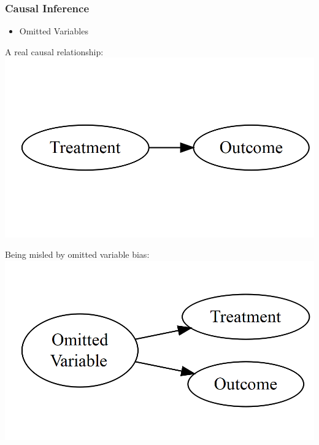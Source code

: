 \documentclass[xcolor=x11names,compress]{beamer}\usepackage[]{graphicx}\usepackage[]{color}
\makeatletter
\def\maxwidth{ %
  \ifdim\Gin@nat@width>\linewidth
    \linewidth
  \else
    \Gin@nat@width
  \fi
}
\newenvironment{knitrout}{}{} %
\renewcommand{\(}{\begin{columns}}
\renewcommand{\)}{\end{columns}}
\newcommand{\<}[1]{\begin{column}{#1}}
\renewcommand{\>}{\end{column}}
\makeatother
\begin{document}
\begin{frame}
\frametitle{Causal Inference}
\begin{itemize}
\item Omitted Variables
\end{itemize}
\begin{multicols}{2}
A real causal relationship:
\begin{knitrout}
\color{fgcolor}
\includegraphics[width=\maxwidth]{figure/explanation3-1} 

\end{knitrout}
\columnbreak
Being misled by omitted variable bias:
\begin{knitrout}
\color{fgcolor}
\includegraphics[width=\maxwidth]{figure/explanation4-1} 

\end{knitrout}
\end{multicols}
\end{frame}
\end{document}
